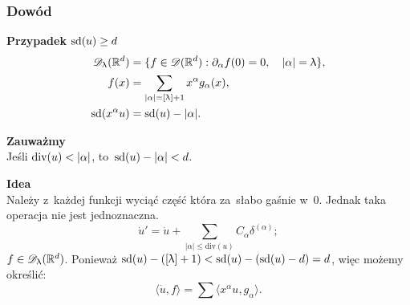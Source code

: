 \documentclass[10pt,t]{beamer}
\begin{document}
\begin{frame}
  \frametitle{Dowód}


  \textbf{Przypadek} $\textrm{sd}( u ) \geq d$ \\
  \begin{subequations}
    \begin{align}
      \label{eq:Epstein-Glaser-08-A}
      \mathcal{D}_{ \uplambda }( \mathbb{R}^{ d } )
      &= \{ f \in \mathcal{D}( \mathbb{R}^{ d } ) : \partial_{ \alpha } f( 0 ) = 0, \quad | \alpha | = \uplambda \}, \\
      \label{eq:EpsteinGlaser-08-B}
      f( x ) &= \sum_{ | \alpha | = [ \uplambda ] + 1 } x^{ \alpha } g_{ \alpha }( x ), \\
      \label{eq:EpsteinGlaser-08-C}
      \textrm{sd}( x^{ \alpha } u ) &= \textrm{sd}( u ) - | \alpha |.
    \end{align}
  \end{subequations}

  \textbf{Zauważmy} \\
  Jeśli $\textrm{div}( u ) < | \alpha |$, to~$\textrm{sd}( u ) - | \alpha | < d$.

  \vspace{\spaceFour}



  \textbf{Idea} \\
  Należy z~każdej funkcji wyciąć część która za~słabo gaśnie w~0.
  Jednak taka operacja nie jest jednoznaczna.
  \begin{equation}
    \label{eq:Epstein-Glaser-09}
    \dot{ u }' = \dot{ u } + \sum\limits_{ | \alpha | \leq \textrm{div}( u ) }
    C_{ \alpha } \delta^{ ( \alpha ) };
  \end{equation}
  $f \in \mathcal{D}_{ \uplambda }( \mathbb{R}^{ d } )$. Ponieważ
  $\textrm{sd}( u ) - ( [ \uplambda ] + 1 ) < \textrm{sd}( u ) - ( \textrm{sd}( u ) - d ) = d$,
  więc możemy określić:
  \begin{equation}
    \label{eq:Epstein-Glaser-10}
    \langle \dot{ u }, f \rangle = \sum \langle x^{ \alpha } u, g_{ \alpha } \rangle.
  \end{equation}

\end{frame}
\end{document}
